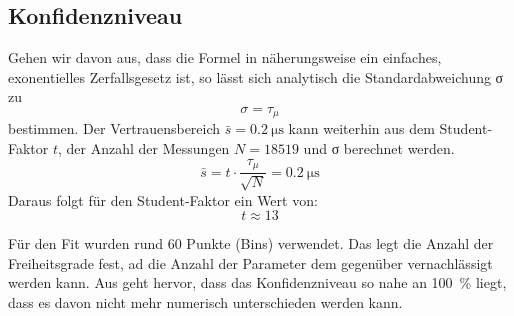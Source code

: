 \subsection{Konfidenzniveau}

Gehen wir davon aus, dass die Formel in  näherungsweise ein einfaches,
exonentielles Zerfallsgesetz ist, so lässt sich analytisch die Standardabweichung
σ zu
\begin{equation}
 σ = τ_μ
\end{equation}
bestimmen. Der Vertrauensbereich $\bar{s} = \SI{0,2}{\micro\second}$ kann weiterhin
aus dem Student-Faktor $t$, der Anzahl der Messungen $N = 18519$ und σ berechnet werden.
\begin{equation}
 \bar{s} = t \cdot \frac{τ_μ}{\sqrt{N}} = \SI{0,2}{\micro\second}
\end{equation}
Daraus folgt für den Student-Faktor ein Wert von:
\begin{equation}
 t \approx 13
\end{equation}

Für den Fit wurden rund 60 Punkte (Bins) verwendet. Das legt die Anzahl der Freiheitsgrade
fest, ad die Anzahl der Parameter dem gegenüber vernachlässigt werden kann.
Aus \cite{student} geht hervor, dass das Konfidenzniveau so nahe an \SI{100}{\percent}
liegt, dass es davon nicht mehr numerisch unterschieden werden kann.
